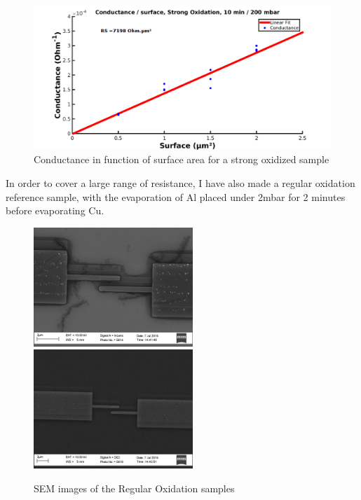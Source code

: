                 \begin{figure}
                    \centering
                    \includegraphics[width=12cm]{ConductanceFitStrongOx.png}
                    \caption{Conductance in function of surface area for a strong oxidized sample}
                    \label{Strongox}
                \end{figure}
                
                In order to cover a large range of resistance, I have also made a regular oxidation reference sample, with the evaporation of Al placed under 2mbar for 2 minutes before evaporating Cu.
                
                 \begin{figure}
                    \centering
                    \includegraphics[width=6cm]{SEMtest16_1.png}
                    \includegraphics[width=6cm]{SEMtest16_2.png}
                    \caption{SEM images of the Regular Oxidation samples}
                    \label{SEMregularox}
                \end{figure}
                
